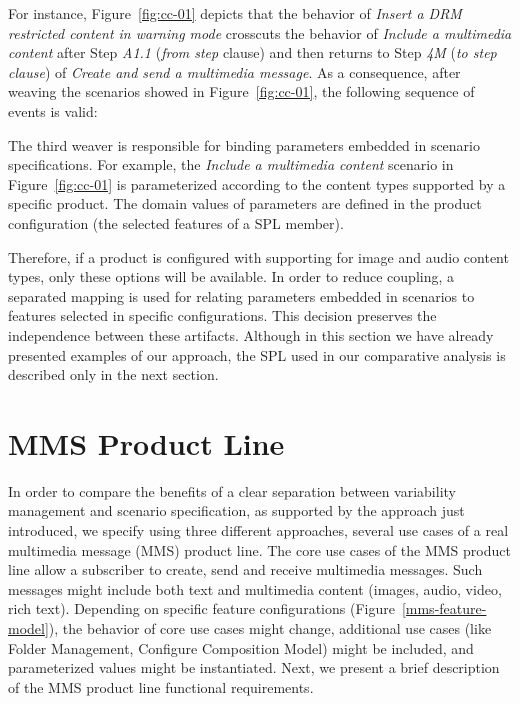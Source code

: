 \documentclass{acm_proc_article-sp}
\begin{document}
For instance, Figure~\ref{fig:cc-01} depicts that the behavior of \emph{Insert a DRM restricted content in warning mode} crosscuts the behavior of \emph{Include a multimedia content} after Step \emph{A1.1} (\emph{from step} clause) and then returns to Step \emph{4M} (\emph{to step clause}) of \emph{Create and send a multimedia message}.  As a consequence, after weaving the scenarios showed in Figure~\ref{fig:cc-01}, the following sequence of events is valid:

\begin{center}
\small{
}
\end{center}

The third weaver is responsible for binding parameters embedded in scenario specifications. For example, the \emph{Include a multimedia content} scenario in Figure~\ref{fig:cc-01} is parameterized according to the content types supported by a specific product. The domain values of parameters are defined in the product configuration (the selected features of a SPL member). 

Therefore, if a product is configured with supporting for image and audio content types, only these options will be available.  In order to reduce coupling, a separated mapping is used for relating parameters embedded in scenarios to features selected in specific configurations. This decision preserves the independence between these artifacts.
Although in this section we have already presented examples of our approach, the SPL used in our comparative analysis is described only in the next section. 


\section{MMS Product Line}
\label{sec:mms-pl}

In order to compare the benefits of a clear separation between variability management and scenario specification, as supported by the approach just introduced, we specify using three different approaches, several use cases of a real multimedia message (MMS) product line.
The core use cases of the MMS product line allow a subscriber to create, send and receive multimedia messages. Such messages might include both text and multimedia content (images, audio, video, rich text). Depending on specific feature configurations (Figure~\ref{mms-feature-model}), the behavior of core use cases might change, additional use cases (like Folder Management, Configure Composition Model) might be included, and parameterized values might be instantiated. Next, we present a brief description of the MMS product line functional requirements.
\end{document}

